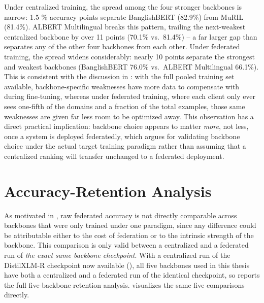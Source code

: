 Under centralized training, the spread among the four stronger backbones is narrow: 1.5 \% accuracy points separate BanglishBERT (82.9\%) from MuRIL (81.4\%). ALBERT Multilingual breaks this pattern, trailing the next-weakest centralized backbone by over 11 points (70.1\% vs.\ 81.4\%) -- a far larger gap than separates any of the other four backbones from each other. Under federated training, the spread widens considerably: nearly 10 points separate the strongest and weakest backbones (BanglishBERT 76.0\% vs.\ ALBERT Multilingual 66.1\%). This is consistent with the discussion in : with the full pooled training set available, backbone-specific weaknesses have more data to compensate with during fine-tuning, whereas under federated training, where each client only ever sees one-fifth of the domains and a fraction of the total examples, those same weaknesses are given far less room to be optimized away. This observation has a direct practical implication: backbone choice appears to matter \emph{more}, not less, once a system is deployed federatedly, which argues for validating backbone choice under the actual target training paradigm rather than assuming that a centralized ranking will transfer unchanged to a federated deployment.


\section{Accuracy-Retention Analysis}
\label{sec:retention}

As motivated in , raw federated accuracy is not directly comparable across backbones that were only trained under one paradigm, since any difference could be attributable either to the cost of federation or to the intrinsic strength of the backbone. This comparison is only valid between a centralized and a federated run of \emph{the exact same backbone checkpoint}. With a centralized run of the DistilXLM-R checkpoint now available (), all five backbones used in this thesis have both a centralized and a federated run of the identical checkpoint, so  reports the full five-backbone retention analysis.  visualizes the same five comparisons directly.

